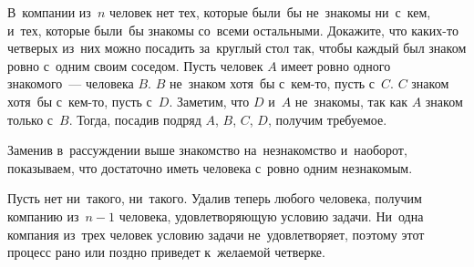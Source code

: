\problem
В~компании из~$n$ человек нет тех, которые были~бы не~знакомы ни~с~кем, и~тех,
которые были~бы знакомы со~всеми остальными.
Докажите, что каких-то четверых из~них можно посадить за~круглый стол так,
чтобы каждый был знаком ровно с~одним своим соседом.
\solution
Пусть человек $A$ имеет ровно одного знакомого~--- человека $B$.
$B$ не~знаком хотя~бы с~кем-то, пусть с~$C$.
$C$ знаком хотя~бы с~кем-то, пусть с~$D$.
Заметим, что $D$ и~$A$ не~знакомы, так как $A$ знаком только с~$B$.
Тогда, посадив подряд $A$, $B$, $C$, $D$, получим требуемое.
\par
Заменив в~рассуждении выше знакомство на~незнакомство и~наоборот, показываем,
что достаточно иметь человека с~ровно одним незнакомым.
\par
Пусть нет ни~такого, ни~такого.
Удалив теперь любого человека, получим компанию из~$n - 1$ человека,
удовлетворяющую условию задачи.
Ни~одна компания из~трех человек условию задачи не~удовлетворяет, поэтому этот
процесс рано или поздно приведет к~желаемой четверке.
\endproblem
